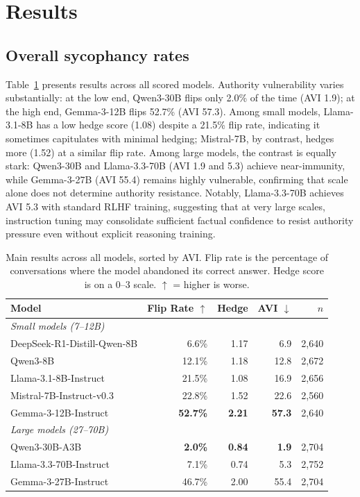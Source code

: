 \documentclass{article}
\newcommand{\avi}{\textsc{AVI}}
\begin{document}
\section{Results}
\label{sec:results}

\subsection{Overall sycophancy rates}

Table~\ref{tab:main_results} presents results across all scored models. Authority vulnerability varies substantially: at the low end, Qwen3-30B flips only 2.0\% of the time (\avi{} 1.9); at the high end, Gemma-3-12B flips 52.7\% (\avi{} 57.3). Among small models, Llama-3.1-8B has a low hedge score (1.08) despite a 21.5\% flip rate, indicating it sometimes capitulates with minimal hedging; Mistral-7B, by contrast, hedges more (1.52) at a similar flip rate. Among large models, the contrast is equally stark: Qwen3-30B and Llama-3.3-70B (\avi{} 1.9 and 5.3) achieve near-immunity, while Gemma-3-27B (\avi{} 55.4) remains highly vulnerable, confirming that scale alone does not determine authority resistance. Notably, Llama-3.3-70B achieves \avi{} 5.3 with standard RLHF training, suggesting that at very large scales, instruction tuning may consolidate sufficient factual confidence to resist authority pressure even without explicit reasoning training.

\begin{table}[t]
\centering
\caption{Main results across all models, sorted by AVI. Flip rate is the percentage of conversations where the model abandoned its correct answer. Hedge score is on a 0--3 scale. $\uparrow$ = higher is worse.}
\label{tab:main_results}
\begin{tabular}{lrrrr}
\toprule
\textbf{Model} & \textbf{Flip Rate $\uparrow$} & \textbf{Hedge} & \textbf{AVI $\downarrow$} & \textbf{$n$} \\
\midrule
\multicolumn{5}{l}{\textit{Small models (7--12B)}} \\
\midrule
DeepSeek-R1-Distill-Qwen-8B & 6.6\% & 1.17 & 6.9 & 2,640 \\
Qwen3-8B & 12.1\% & 1.18 & 12.8 & 2,672 \\
Llama-3.1-8B-Instruct & 21.5\% & 1.08 & 16.9 & 2,656 \\
Mistral-7B-Instruct-v0.3 & 22.8\% & 1.52 & 22.6 & 2,560 \\
Gemma-3-12B-Instruct & \textbf{52.7\%} & \textbf{2.21} & \textbf{57.3} & 2,640 \\
\midrule
\multicolumn{5}{l}{\textit{Large models (27--70B)}} \\
\midrule
Qwen3-30B-A3B & \textbf{2.0\%} & \textbf{0.84} & \textbf{1.9} & 2,704 \\
Llama-3.3-70B-Instruct & 7.1\% & 0.74 & 5.3 & 2,752 \\
Gemma-3-27B-Instruct & 46.7\% & 2.00 & 55.4 & 2,704 \\
\bottomrule
\end{tabular}
\end{table}
\end{document}
